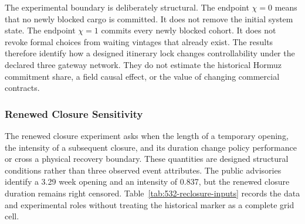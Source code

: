\documentclass[a4paper,fleqn]{cas-sc}
\begin{document}
The experimental boundary is deliberately structural. The endpoint $\chi=0$
means that no newly blocked cargo is committed. It does not remove the initial
system state. The endpoint $\chi=1$ commits every newly blocked cohort. It does
not revoke formal choices from waiting vintages that already exist. The results
therefore identify how a designed itinerary lock changes controllability under
the declared three gateway network. They do not estimate the historical Hormuz
commitment share, a field causal effect, or the value of changing commercial
contracts.

\subsubsection{Renewed Closure Sensitivity}
\label{subsubsec:reclosure-sensitivity}

The renewed closure experiment asks when the length of a temporary opening,
the intensity of a subsequent closure, and its duration change policy
performance or cross a physical recovery boundary. These quantities are
designed structural conditions rather than three observed event attributes.
The public advisories identify a 3.29 week opening and an intensity of 0.837,
but the renewed closure duration remains right censored. Table~\ref{tab:532-reclosure-inputs}
records the data and experimental roles without treating the historical marker
as a complete grid cell.
\end{document}
